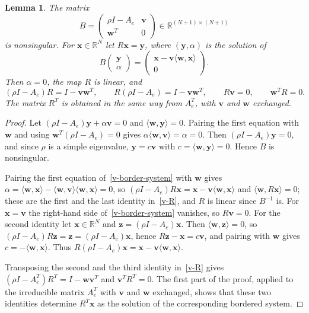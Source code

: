 \documentclass[11pt]{article}
\theoremstyle{plain}
\newtheorem{lemma}[theorem]{Lemma}
\theoremstyle{remark}
\numberwithin{equation}{section}
\begin{document}
\begin{lemma}\label{v-border}
The matrix
\begin{equation}\label{v-border-matrix}
B=\begin{pmatrix}\rho I-A_e&\bm v\\ \bm w^T&0\end{pmatrix}\in\mathbb{R}^{(N+1)\times(N+1)}
\end{equation}
is nonsingular. For $\bm x\in\mathbb{R}^N$ let $R\bm x=\bm y$, where
$(\bm y,\alpha)$ is the solution of
\begin{equation}\label{v-border-system}
B\begin{pmatrix}\bm y\\ \alpha\end{pmatrix}
=\begin{pmatrix}\bm x-\bm v\langle\bm w,\bm x\rangle\\ 0\end{pmatrix}.
\end{equation}
Then $\alpha=0$, the map $R$ is linear, and
\begin{equation}\label{v-R}
(\rho I-A_e)R=I-\bm v\bm w^T,\qquad R(\rho I-A_e)=I-\bm v\bm w^T,\qquad
R\bm v=0,\qquad \bm w^TR=0 .
\end{equation}
The matrix $R^T$ is obtained in the same way from $A_e^T$, with $\bm v$ and
$\bm w$ exchanged.
\end{lemma}
\begin{proof}
Let $(\rho I-A_e)\bm y+\alpha\bm v=0$ and $\langle\bm w,\bm y\rangle=0$. Pairing
the first equation with $\bm w$ and using $\bm w^T(\rho I-A_e)=0$ gives
$\alpha\langle\bm w,\bm v\rangle=\alpha=0$. Then $(\rho I-A_e)\bm y=0$, and
since $\rho$ is a simple eigenvalue, $\bm y=c\bm v$ with
$c=\langle\bm w,\bm y\rangle=0$. Hence $B$ is nonsingular.

Pairing the first equation of~\eqref{v-border-system} with $\bm w$ gives
$\alpha=\langle\bm w,\bm x\rangle-\langle\bm w,\bm v\rangle\langle\bm w,\bm x\rangle=0$,
so $(\rho I-A_e)R\bm x=\bm x-\bm v\langle\bm w,\bm x\rangle$ and
$\langle\bm w,R\bm x\rangle=0$; these are the first and the last identity
in~\eqref{v-R}, and $R$ is linear since $B^{-1}$ is. For $\bm x=\bm v$ the right-hand side
of~\eqref{v-border-system} vanishes, so $R\bm v=0$. For the second identity let
$\bm x\in\mathbb{R}^N$ and $\bm z=(\rho I-A_e)\bm x$. Then
$\langle\bm w,\bm z\rangle=0$, so $(\rho I-A_e)R\bm z=\bm z=(\rho I-A_e)\bm x$,
hence $R\bm z-\bm x=c\bm v$, and pairing with $\bm w$ gives
$c=-\langle\bm w,\bm x\rangle$. Thus $R(\rho I-A_e)\bm x=\bm x-\bm v\langle\bm w,\bm x\rangle$.

Transposing the second and the third identity in~\eqref{v-R} gives
$(\rho I-A_e^T)R^T=I-\bm w\bm v^T$ and $\bm v^TR^T=0$. The first part of the
proof, applied to the irreducible matrix $A_e^T$ with $\bm v$ and $\bm w$
exchanged, shows that these two identities determine $R^T\bm x$ as the solution of the
corresponding bordered system.
\end{proof}
\end{document}
